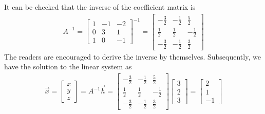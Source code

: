 \begin{solution}
It can be checked that the inverse of the coefficient matrix is
\begin{align*}
A^{-1} =
\begin{bmatrix}
1 & -1 & -2 \\
0 & 3 & 1 \\
1 & 0 & -1
\end{bmatrix}^{-1}   
=
\begin{bmatrix}
-\frac{3}{2} & -\frac{1}{2} & \frac{5}{2} \\
\frac{1}{2} & \frac{1}{2} & -\frac{1}{2} \\
-\frac{3}{2} & -\frac{1}{2} & \frac{3}{2}
\end{bmatrix}
\end{align*}
The readers are encouraged to derive the inverse by themselves. Subsequently, we have the solution to the linear system as
\begin{align*}
\vec{x} = 
\begin{bmatrix}
x \\
y \\
z
\end{bmatrix}
= A^{-1}\vec{h} =  
\begin{bmatrix}
-\frac{3}{2} & -\frac{1}{2} & \frac{5}{2} \\
\frac{1}{2} & \frac{1}{2} & -\frac{1}{2} \\
-\frac{3}{2} & -\frac{1}{2} & \frac{3}{2}
\end{bmatrix}
\begin{bmatrix}
3 \\
2 \\
3
\end{bmatrix}
=
\begin{bmatrix}
2 \\
1 \\
-1
\end{bmatrix}
\end{align*}
\end{solution}

